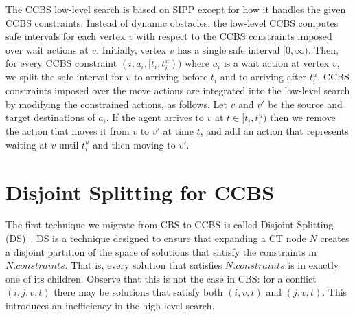 \documentclass[letterpaper]{article} %
\newcommand\roni[1]{\nb{\textbf{Roni:}}{orange}{#1}}
\newcommand{\cbs}{\ac{CBS}\xspace}
\newcommand{\ccbs}{\ac{CCBS}\xspace}
\newcommand{\ct}{\ac{CT}\xspace}
\newcommand{\sipp}{\ac{SIPP}\xspace}
\newcommand{\const}{\textit{constraints}\xspace}
\newcommand{\ds}{\ac{DS}\xspace}
\begin{document}
The \ccbs low-level search is based on \sipp except for how it handles the given \ccbs constraints. 
Instead of dynamic obstacles, the low-level \ccbs computes safe intervals for each vertex $v$ with respect to the \ccbs constraints imposed over wait actions at $v$. 
Initially, vertex $v$ has a single safe interval $[0, \infty)$. 
Then, for every \ccbs constraint $(i, a_i, [t_i, t_i^u))$ 
where $a_i$ is a wait action at vertex $v$, we split the safe interval for $v$ 
to arriving before $t_i$ and to arriving after $t_i^u$. 
\ccbs constraints imposed over the move actions are integrated into the low-level search by modifying the constrained actions, as follows. 
Let $v$ and $v'$ be the source and target destinations of $a_i$. 
If the agent arrives to $v$ at $t\in [t_i, t^u_i)$ then we remove the action that moves it from $v$ to $v'$ at time $t$, and add an action that represents waiting at $v$ until $t^u_i$ and then moving to $v'$.






\section{Disjoint Splitting for \ccbs}

The first technique we migrate from \cbs to \ccbs is called Disjoint Splitting (\ds)~\cite{li2019disjoint}. 
\ds is a technique designed to ensure that expanding a \ct node $N$ creates a disjoint partition of the space of solutions that satisfy the constraints in $N.\const$.  
That is, every solution that satisfies $N.\const$ is in exactly one of its children. Observe that this is not the case in \cbs: for a conflict $(i,j,v,t)$ there may be solutions that satisfy both $(i,v,t)$ and $(j,v,t)$. 
This introduces an inefficiency in the high-level search. 
\end{document}
